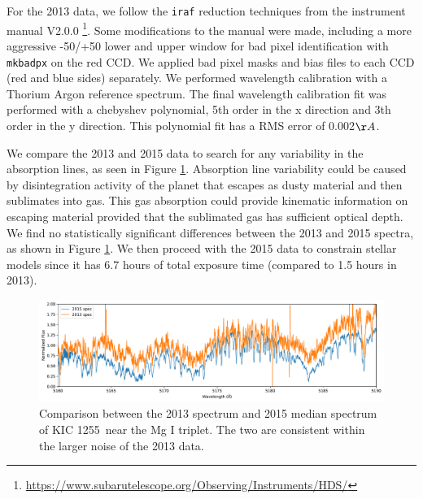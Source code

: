 \documentclass[preprint,trackchanges]{aastex61}
\newcommand{\shStar}{KIC 1255}
\begin{document}
For the 2013 data, we follow the \texttt{iraf} reduction techniques from the instrument manual V2.0.0  \footnote{\url{https://www.subarutelescope.org/Observing/Instruments/HDS/}}.
Some modifications to the manual were made, including a more aggressive -50/+50 lower and upper window for bad pixel identification with \texttt{mkbadpx} on the red CCD.
We applied bad pixel masks and bias files to each CCD (red and blue sides) separately.
We performed wavelength calibration with a Thorium Argon reference spectrum.
The final wavelength calibration fit was performed with a chebyshev polynomial, 5th order in the x direction and 3th order in the y direction.
This polynomial fit has a RMS error of 0.002$\AA$.

We compare the 2013 and 2015 data to search for any variability in the absorption lines, as seen in Figure \ref{fig:spec2013vs2015}.
Absorption line variability could be caused by disintegration activity of the planet that escapes as dusty material and then sublimates into gas.
This gas absorption could provide kinematic information on escaping material provided that the sublimated gas has sufficient optical depth.
We find no statistically significant differences between the 2013 and 2015 spectra, as shown in Figure \ref{fig:spec2013vs2015}.
We then proceed with the 2015 data to constrain stellar models since it has 6.7 hours of total exposure time (compared to 1.5 hours in 2013).

\begin{figure}[!hbtp]
\begin{centering}
\includegraphics[width=1.0\textwidth]{2013_vs_2015_spec.pdf}
\caption{Comparison between the 2013 spectrum and 2015 median spectrum of \shStar\ near the Mg I triplet. The two are consistent within the larger noise of the 2013 data.}\label{fig:spec2013vs2015}
\end{centering}
\end{figure}
\end{document}
